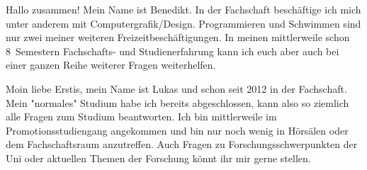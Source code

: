 \begin{multicols*}{2}
{Hallo zusammen! Mein Name ist Benedikt. In der Fachschaft beschäftige ich mich unter anderem mit Computergrafik/Design. Programmieren und Schwimmen sind nur zwei meiner weiteren Freizeitbeschäftigungen. In meinen mittlerweile schon 8~Semestern Fachschafts- und Studienerfahrung kann ich euch aber auch bei einer ganzen Reihe weiterer Fragen weiterhelfen. 
}
\vspace{0.5cm}


{Moin liebe Erstis,
	mein Name ist Lukas und schon seit 2012 in der Fachschaft. Mein "normales" Studium habe ich bereits abgeschlossen, kann also so ziemlich alle Fragen zum Studium beantworten.
	Ich bin mittlerweile im Promotionsstudiengang angekommen und bin nur noch wenig in Hörsälen oder dem Fachschaftsraum anzutreffen.
	Auch Fragen zu Forschungsschwerpunkten der Uni oder aktuellen Themen der Forschung könnt ihr mir gerne stellen.}



\end{multicols*}
